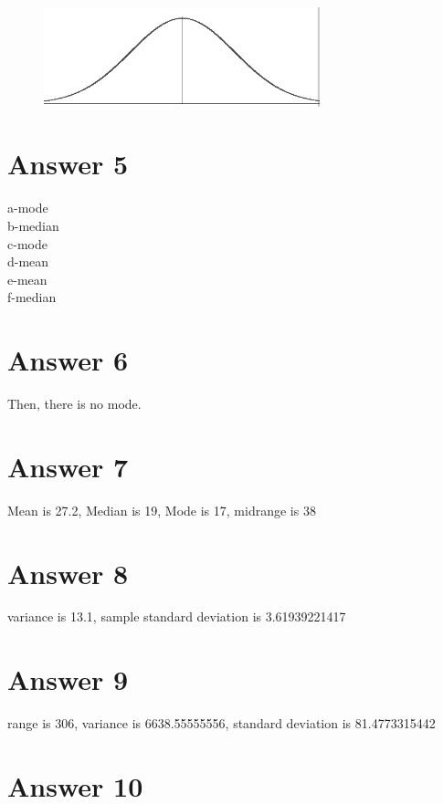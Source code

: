 \documentclass[12pt]{article}
\begin{document}
\begin{figure}[H]
\includegraphics[width=8cm]{normal-distribution-probability.jpg}
\centering
\end{figure}


\section*{Answer 5}
a-mode \\
b-median \\
c-mode \\
d-mean \\
e-mean \\
f-median \\

\section*{Answer 6}
Then, there is no mode.\\

\section*{Answer 7}

Mean is 27.2, Median is 19, Mode is 17, midrange is 38 \\

\section*{Answer 8}

variance is 13.1, sample standard deviation is 3.61939221417 \\

\section*{Answer 9}

range is 306, variance is 6638.55555556, standard deviation is 81.4773315442 \\

\section*{Answer 10}
\end{document}
